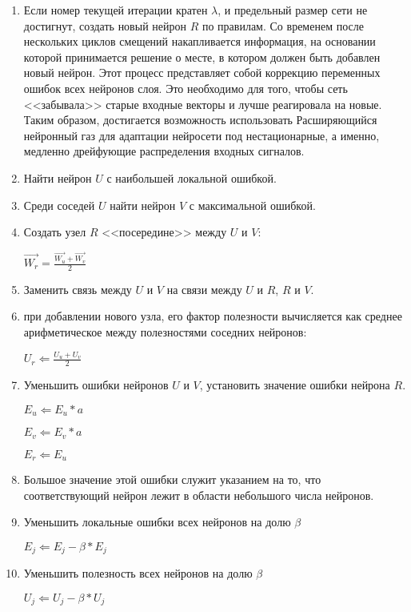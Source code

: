 \documentclass[unicode, 12pt, a4paper,oneside,fleqn]{article}
\begin{document}
\begin{enumerate}
\item %
  Если номер текущей итерации кратен $\lambda$, и предельный
  размер сети не достигнут, создать новый нейрон $R$ по правилам. Со
  временем после нескольких циклов смещений накапливается информация,
  на основании которой принимается решение о месте, в котором должен
  быть добавлен новый нейрон. Этот процесс представляет собой
  коррекцию переменных ошибок всех нейронов слоя. Это необходимо для
  того, чтобы сеть <<забывала>> старые входные векторы и лучше
  реагировала на новые. Таким образом, достигается возможность
  использовать Расширяющийся нейронный газ для адаптации нейросети под
  нестационарные, а именно, медленно дрейфующие распределения входных
  сигналов.

\item %
  Найти нейрон $U$ с наибольшей локальной ошибкой.

\item %
  Среди соседей $U$ найти нейрон $V$ с максимальной ошибкой.

\item %
  Создать узел $R$ <<посередине>> между $U$ и $V$:

  $\vec{W_r}=\frac{\vec{W_u} + \vec{W_v}}{2}$

\item %
  Заменить связь между $U$ и $V$ на связи между $U$ и $R$, $R$ и
  $V$.

\item %
  при добавлении нового узла, его фактор полезности вычисляется как
  среднее арифметическое между полезностями соседних нейронов:

  $U_r \Leftarrow \frac{U_u + U_v}{2}$

\item %
  Уменьшить ошибки нейронов $U$ и $V$, установить значение ошибки
  нейрона $R$.

  $E_u\Leftarrow E_u*a$
  
  $E_v\Leftarrow E_v*a$
  
  $E_r\Leftarrow E_u$

\item %
  Большое значение этой ошибки служит указанием на то, что
  соответствующий нейрон лежит в области небольшого числа нейронов.

\item %
  Уменьшить локальные ошибки всех нейронов на долю $\beta$
  
  $E_j \Leftarrow E_j - \beta*E_j$


\item %
  Уменьшить полезность всех нейронов на долю $\beta$

  $U_j \Leftarrow U_j - \beta*U_j$

\end{enumerate}
  
\end{document}
